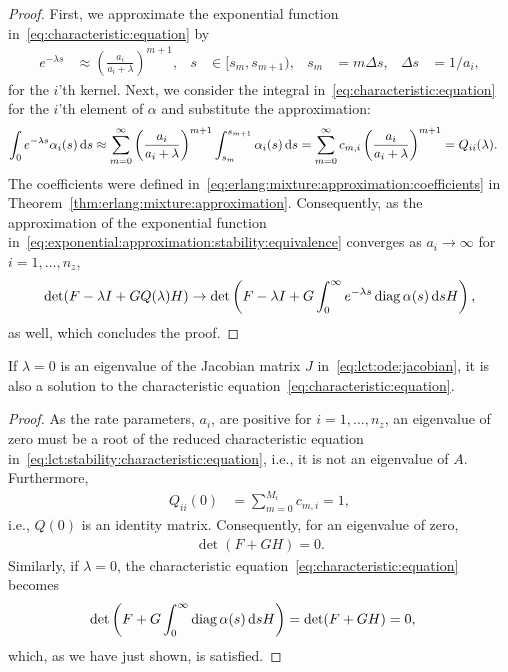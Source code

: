 %
\begin{proof}
	First, we approximate the exponential function in~\eqref{eq:characteristic:equation} by
	\begin{align}\label{eq:exponential:approximation:stability:equivalence}
		e^{-\lambda s} &\approx \left(\frac{a_i}{a_i + \lambda}\right)^{m+1}, &
		s &\in [s_m, s_{m+1}), & s_m &= m \Delta s, & \Delta s &= 1/a_i,
	\end{align}
	for the $i$'th kernel.
	Next, we consider the integral in~\eqref{eq:characteristic:equation} for the $i$'th element of $\alpha$ and substitute the approximation:
	\begin{align}
		\int_0 e^{-\lambda s} \alpha_i(s) \,\mathrm{d} s
		&\approx \sum_{m=0}^\infty \left(\frac{a_i}{a_i + \lambda}\right)^{m+1} \int_{s_m}^{s_{m+1}} \alpha_i(s) \,\mathrm{d} s = \sum_{m=0}^\infty c_{m, i} \left(\frac{a_i}{a_i + \lambda}\right)^{m+1} = Q_{ii}(\lambda).
	\end{align}
	The coefficients were defined in~\eqref{eq:erlang:mixture:approximation:coefficients} in Theorem~\ref{thm:erlang:mixture:approximation}. Consequently, as the approximation of the exponential function in~\eqref{eq:exponential:approximation:stability:equivalence} converges as $a_i \rightarrow \infty$ for $i = 1, \ldots, n_z$,
	\begin{align}
		\det(F - \lambda I + G Q(\lambda) H) \rightarrow \det\left(F - \lambda I + G \int_0^\infty e^{-\lambda s} \operatorname{diag} \alpha(s) \,\mathrm{d} s H\right),
	\end{align}
	as well, which concludes the proof.
\end{proof}
%
\begin{corollary}
	If $\lambda = 0$ is an eigenvalue of the Jacobian matrix $J$ in~\eqref{eq:lct:ode:jacobian}, it is also a solution to the characteristic equation~\eqref{eq:characteristic:equation}.
\end{corollary}
%
\begin{proof}
	As the rate parameters, $a_i$, are positive for $i = 1, \ldots, n_z$, an eigenvalue of zero must be a root of the reduced characteristic equation in~\eqref{eq:lct:stability:characteristic:equation}, i.e., it is not an eigenvalue of $A$. Furthermore,
	\begin{align}
		Q_{ii}(0) &= \sum_{m=0}^{M_i} c_{m, i} = 1,
	\end{align}
	i.e., $Q(0)$ is an identity matrix.
	Consequently, for an eigenvalue of zero,
	\begin{align}
		\det(F + G H) = 0.
	\end{align}
	Similarly, if $\lambda = 0$, the characteristic equation~\eqref{eq:characteristic:equation} becomes
	\begin{align}
		\det\left(F + G \int_0^\infty \operatorname{diag} \alpha(s) \,\mathrm{d} s H\right) &= \det(F + G H) = 0,
	\end{align}
	which, as we have just shown, is satisfied.
\end{proof}
